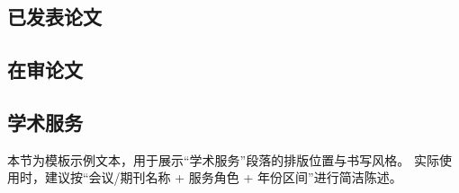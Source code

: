 
\reseachresult

\subsection*{已发表论文}


\subsection*{在审论文}

\subsection*{学术服务}

本节为模板示例文本，用于展示“学术服务”段落的排版位置与书写风格。
实际使用时，建议按“会议/期刊名称 + 服务角色 + 年份区间”进行简洁陈述。

\acknowledgement


  \iflib
  \else
  \newpage
  \cleardoublepage
  \fi
